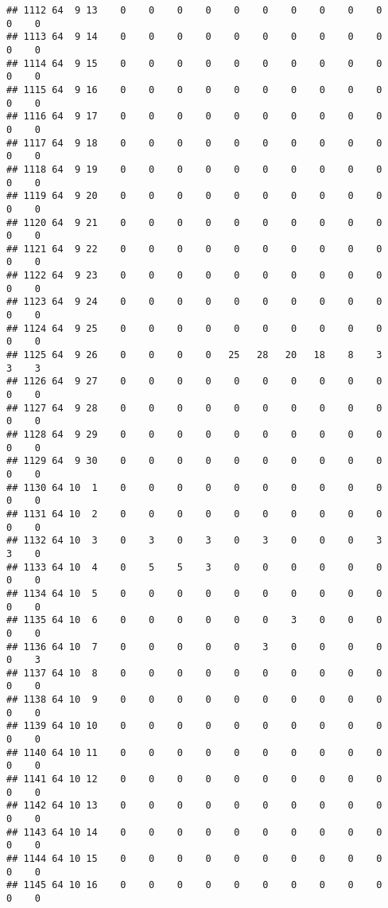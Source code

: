 \documentclass[]{article}
\begin{document}
\begin{verbatim}
## 1112 64  9 13    0    0    0    0    0    0    0    0    0    0    0    0
## 1113 64  9 14    0    0    0    0    0    0    0    0    0    0    0    0
## 1114 64  9 15    0    0    0    0    0    0    0    0    0    0    0    0
## 1115 64  9 16    0    0    0    0    0    0    0    0    0    0    0    0
## 1116 64  9 17    0    0    0    0    0    0    0    0    0    0    0    0
## 1117 64  9 18    0    0    0    0    0    0    0    0    0    0    0    0
## 1118 64  9 19    0    0    0    0    0    0    0    0    0    0    0    0
## 1119 64  9 20    0    0    0    0    0    0    0    0    0    0    0    0
## 1120 64  9 21    0    0    0    0    0    0    0    0    0    0    0    0
## 1121 64  9 22    0    0    0    0    0    0    0    0    0    0    0    0
## 1122 64  9 23    0    0    0    0    0    0    0    0    0    0    0    0
## 1123 64  9 24    0    0    0    0    0    0    0    0    0    0    0    0
## 1124 64  9 25    0    0    0    0    0    0    0    0    0    0    0    0
## 1125 64  9 26    0    0    0    0   25   28   20   18    8    3    3    3
## 1126 64  9 27    0    0    0    0    0    0    0    0    0    0    0    0
## 1127 64  9 28    0    0    0    0    0    0    0    0    0    0    0    0
## 1128 64  9 29    0    0    0    0    0    0    0    0    0    0    0    0
## 1129 64  9 30    0    0    0    0    0    0    0    0    0    0    0    0
## 1130 64 10  1    0    0    0    0    0    0    0    0    0    0    0    0
## 1131 64 10  2    0    0    0    0    0    0    0    0    0    0    0    0
## 1132 64 10  3    0    3    0    3    0    3    0    0    0    3    3    0
## 1133 64 10  4    0    5    5    3    0    0    0    0    0    0    0    0
## 1134 64 10  5    0    0    0    0    0    0    0    0    0    0    0    0
## 1135 64 10  6    0    0    0    0    0    0    3    0    0    0    0    0
## 1136 64 10  7    0    0    0    0    0    3    0    0    0    0    0    3
## 1137 64 10  8    0    0    0    0    0    0    0    0    0    0    0    0
## 1138 64 10  9    0    0    0    0    0    0    0    0    0    0    0    0
## 1139 64 10 10    0    0    0    0    0    0    0    0    0    0    0    0
## 1140 64 10 11    0    0    0    0    0    0    0    0    0    0    0    0
## 1141 64 10 12    0    0    0    0    0    0    0    0    0    0    0    0
## 1142 64 10 13    0    0    0    0    0    0    0    0    0    0    0    0
## 1143 64 10 14    0    0    0    0    0    0    0    0    0    0    0    0
## 1144 64 10 15    0    0    0    0    0    0    0    0    0    0    0    0
## 1145 64 10 16    0    0    0    0    0    0    0    0    0    0    0    0

\end{verbatim}
\end{document}
